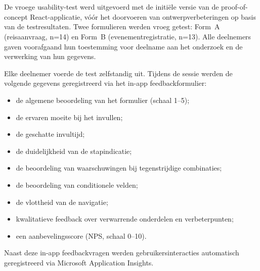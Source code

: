 
\chapter{}%
\label{ch:vroege-usability-test}

\section{}

De vroege usability-test werd uitgevoerd met de initiële versie van de proof-of-concept React-applicatie, vóór het doorvoeren van ontwerpverbeteringen op basis van de testresultaten. Twee formulieren werden vroeg getest: Form~A (reisaanvraag, n=14) en Form~B (evenementregistratie, n=13). Alle deelnemers gaven voorafgaand hun toestemming voor deelname aan het onderzoek en de verwerking van hun gegevens.

Elke deelnemer voerde de test zelfstandig uit. Tijdens de sessie werden de volgende gegevens geregistreerd via het in-app feedbackformulier:
\begin{itemize}
  \item de algemene beoordeling van het formulier (schaal 1–5);
  \item de ervaren moeite bij het invullen;
  \item de geschatte invultijd;
  \item de duidelijkheid van de stapindicatie;
  \item de beoordeling van waarschuwingen bij tegenstrijdige combinaties;
  \item de beoordeling van conditionele velden;
  \item de vlottheid van de navigatie;
  \item kwalitatieve feedback over verwarrende onderdelen en verbeterpunten;
  \item een aanbevelingsscore (NPS, schaal 0–10).
\end{itemize}

Naast deze in-app feedbackvragen werden gebruikersinteracties automatisch geregistreerd via Microsoft Application Insights.

